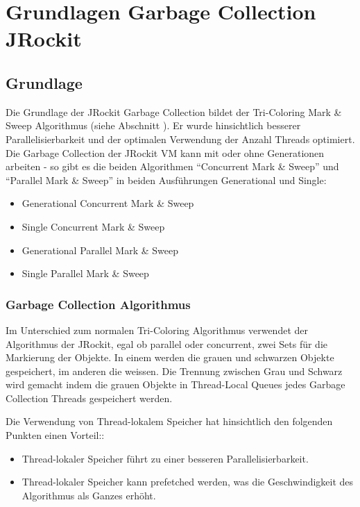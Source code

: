 \chapter{Grundlagen Garbage Collection JRockit}\label{jrockit garbage collection}
\section{Grundlage}
Die Grundlage der JRockit Garbage Collection bildet der Tri-Coloring Mark \& Sweep Algorithmus (siehe Abschnitt ). Er wurde hinsichtlich besserer Parallelisierbarkeit und der optimalen Verwendung der Anzahl Threads optimiert. Die Garbage Collection der JRockit VM kann mit oder ohne Generationen arbeiten - so gibt es die beiden Algorithmen ``Concurrent Mark \& Sweep'' und ``Parallel Mark \& Sweep'' in beiden Ausführungen Generational und Single:

\begin{itemize}
	\item Generational Concurrent Mark \& Sweep
	\item Single Concurrent Mark \& Sweep
	\item Generational Parallel Mark \& Sweep	
	\item Single Parallel Mark \& Sweep
\end{itemize}

\subsection{Garbage Collection Algorithmus}
Im Unterschied zum normalen Tri-Coloring Algorithmus verwendet der Algorithmus der JRockit, egal ob parallel oder concurrent, zwei Sets für die Markierung der Objekte. In einem werden die grauen und schwarzen Objekte gespeichert, im anderen die weissen. Die Trennung zwischen Grau und Schwarz wird gemacht indem die grauen Objekte in Thread-Local Queues jedes Garbage Collection Threads gespeichert werden. 

Die Verwendung von Thread-lokalem Speicher hat hinsichtlich den folgenden Punkten einen Vorteil:\cite[S. 79]{lagergren2010oracle}:
\begin{itemize}
	\item Thread-lokaler Speicher führt zu einer besseren Parallelisierbarkeit.
	\item Thread-lokaler Speicher kann prefetched werden, was die Geschwindigkeit des Algorithmus als Ganzes erhöht.
\end{itemize}

